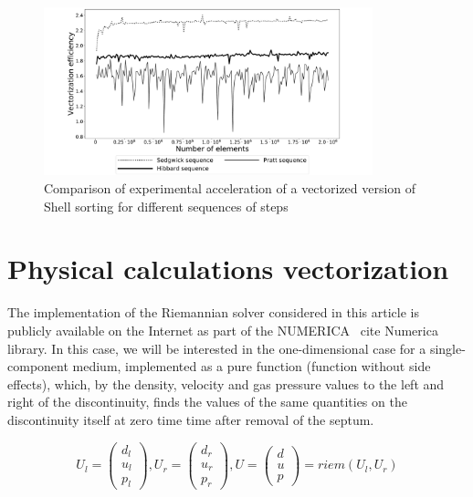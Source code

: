 \documentclass[
11pt,%
tightenlines,%
twoside,%
onecolumn,%
nofloats,%
nobibnotes,%
nofootinbib,%
superscriptaddress,%
noshowpacs,%
centertags]%
{revtex4}
\begin{document}
\begin{figure}[h]
\setcaptionmargin{5mm}
\onelinecaptionstrue  %
\includegraphics[width=0.85\textwidth]{pics/theoretical_eff.pdf}
\caption{Comparison of experimental acceleration of a vectorized version of Shell sorting for different sequences of steps}\label{experim_accel}
\end{figure}
        
\section{Physical calculations vectorization}

The implementation of the Riemannian solver considered in this article is publicly available on the Internet as part of the NUMERICA \ cite {Numerica} library. In this case, we will be interested in the one-dimensional case for a single-component medium, implemented as a pure function (function without side effects), which, by the density, velocity and gas pressure values to the left and right of the discontinuity, finds the values of the same quantities on the discontinuity itself at zero time time after removal of the septum.

\begin{equation}\label{eq:riemann}
U_l = \left( \begin{array}{ccc} d_l \\ u_l \\ p_l \end{array} \right),
U_r = \left( \begin{array}{ccc} d_r \\ u_r \\ p_r \end{array} \right),
U = \left( \begin{array}{ccc} d \\ u \\ p \end{array} \right) = riem(U_l, U_r)
\end{equation}
\end{document}
